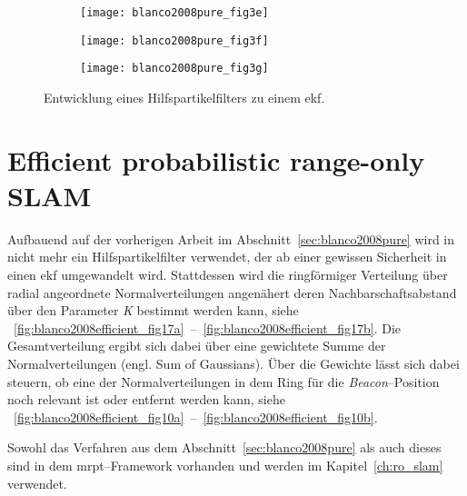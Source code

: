 \begin{figure}
	\begin{subfigure}[t]{0.3\linewidth}
		\texttt{[image: blanco2008pure\_fig3e]}
		\caption{}
		\label{fig:blanco2008pure_fig3e}
	\end{subfigure}
	\hfill
	\begin{subfigure}[t]{0.3\linewidth}
		\texttt{[image: blanco2008pure\_fig3f]}
		\caption{}
		\label{fig:blanco2008pure_fig3f}
	\end{subfigure}
	\hfill
	\begin{subfigure}[t]{0.3\linewidth}
		\texttt{[image: blanco2008pure\_fig3g]}
		\caption{}
		\label{fig:blanco2008pure_fig3g}
	\end{subfigure}
	\caption{Entwicklung eines Hilfspartikelfilters zu einem \Gls{ekf}.}
	\label{fig:blanco2008pure_fig3}
\end{figure}


\begin{comment}
------------------------------------------------------------------------------------------
- \cite{blanco2008efficient}
	- Efficient probabilistic range-only SLAM (71)
\end{comment}
\section{Efficient probabilistic range-only SLAM}

Aufbauend auf der vorherigen Arbeit im Abschnitt~\ref{sec:blanco2008pure} wird in  \cite{blanco2008efficient} nicht mehr ein Hilfspartikelfilter verwendet, der ab einer gewissen Sicherheit in einen \Gls{ekf} umgewandelt wird. Stattdessen wird die ringförmiger Verteilung über radial angeordnete Normalverteilungen angenähert deren Nachbarschaftsabstand über den Parameter \textit{K} bestimmt werden kann, siehe \figurename~\ref{fig:blanco2008efficient_fig17a}~--~\ref{fig:blanco2008efficient_fig17b}. Die Gesamtverteilung ergibt sich dabei über eine gewichtete Summe der Normalverteilungen (engl. Sum of Gaussians). Über die Gewichte lässt sich dabei steuern, ob eine der Normalverteilungen in dem Ring für die \textit{Beacon}--Position noch relevant ist oder entfernt werden kann, siehe \figurename~\ref{fig:blanco2008efficient_fig10a}~--~\ref{fig:blanco2008efficient_fig10b}.

Sowohl das Verfahren aus dem Abschnitt~\ref{sec:blanco2008pure} als auch dieses sind in dem \Gls{mrpt}--Framework vorhanden und werden im Kapitel~\ref{ch:ro_slam} verwendet.

